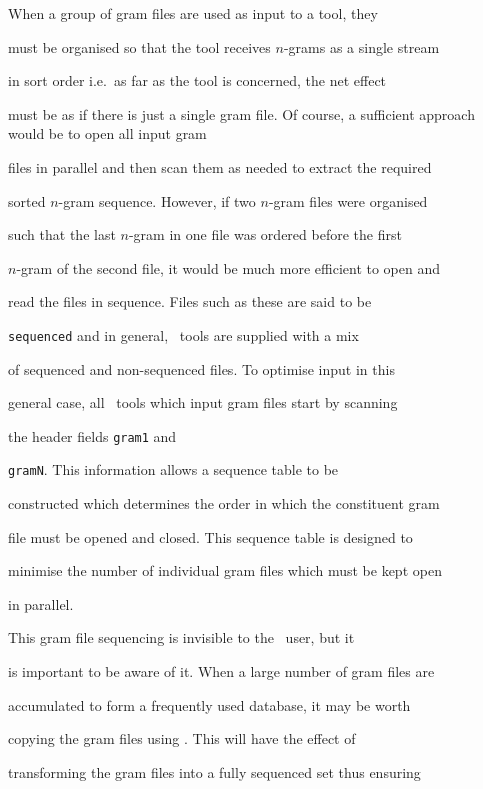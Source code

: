 When a group of gram files are used as input to a tool, they


must be organised so that the tool receives $n$-grams as a single stream


in sort order i.e.\ as far as the tool is concerned, the net effect


must be as if there is just a single gram file.  Of course, a sufficient approach would be to open all input gram


files in parallel and then scan them as needed to extract the required


sorted $n$-gram sequence.  However, if two $n$-gram files were organised


such that the last $n$-gram in one file was ordered before the first


$n$-gram of the second file, it would be much more efficient to open and


read the files in sequence. Files such as these are said to be


\texttt{sequenced} and in general, \HTK\ tools are supplied with a mix


of sequenced and non-sequenced files.  To optimise input in this


general case, all \HTK\ tools which input gram files start by scanning


the header fields \texttt{gram1} and 


\texttt{gramN}. This information allows a sequence table to be


constructed which determines the order in which the constituent gram


file must be opened and closed.  This sequence table is designed to


minimise the number of individual gram files which must be kept open


in parallel. 





This gram file sequencing is invisible to the \HTK\ user, but it


is important to be aware of it.  When a large number of gram files are


accumulated to form a frequently used database, it may be worth


copying the gram files using .  This will have the effect of


transforming the gram files into a fully sequenced set thus ensuring


